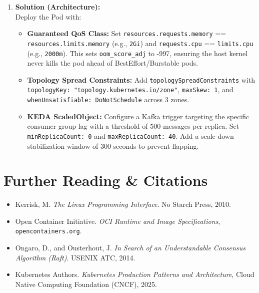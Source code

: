 \begin{enumerate}[leftmargin=18pt]
  \item \textbf{Solution (Architecture):}\\
  Deploy the Pod with:
  \begin{itemize}[leftmargin=12pt]
    \item \textbf{Guaranteed QoS Class:} Set \texttt{resources.requests.memory} == \texttt{resources.limits.memory} (e.g., \texttt{2Gi}) and \texttt{requests.cpu} == \texttt{limits.cpu} (e.g., \texttt{2000m}). This sets \texttt{oom\_score\_adj} to -997, ensuring the host kernel never kills the pod ahead of BestEffort/Burstable pods.
    \item \textbf{Topology Spread Constraints:} Add \texttt{topologySpreadConstraints} with \texttt{topologyKey: "topology.kubernetes.io/zone"}, \texttt{maxSkew: 1}, and \texttt{whenUnsatisfiable: DoNotSchedule} across 3 zones.
    \item \textbf{KEDA ScaledObject:} Configure a Kafka trigger targeting the specific consumer group lag with a threshold of 500 messages per replica. Set \texttt{minReplicaCount: 0} and \texttt{maxReplicaCount: 40}. Add a scale-down stabilization window of 300 seconds to prevent flapping.
  \end{itemize}
\end{enumerate}

\section{Further Reading \& Citations}
\begin{itemize}[leftmargin=15pt]
  \item Kerrisk, M. \emph{The Linux Programming Interface}. No Starch Press, 2010.
  \item Open Container Initiative. \emph{OCI Runtime and Image Specifications}, \texttt{opencontainers.org}.
  \item Ongaro, D., and Ousterhout, J. \emph{In Search of an Understandable Consensus Algorithm (Raft)}. USENIX ATC, 2014.
  \item Kubernetes Authors. \emph{Kubernetes Production Patterns and Architecture}, Cloud Native Computing Foundation (CNCF), 2025.
\end{itemize}
